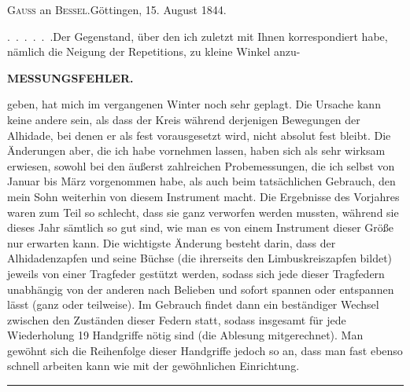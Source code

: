 \par\bigskip
\begin{center}{\large\textsc{Gauss} an \textsc{Bessel}.\quad Göttingen, 15. August 1844.}\end{center}
\par\noindent\hspace*{\parindent}.\ .\ .\ .\ .\ .\enspace Der Gegenstand, über den ich zuletzt mit Ihnen korrespondiert habe, nämlich die Neigung der Repetitions, zu kleine Winkel anzu-

\par\clearpage
\noindent\null\hfill{\small\textbf{MESSUNGSFEHLER.}}\hfill{}\par\medskip
\noindent geben, hat mich im vergangenen Winter noch sehr geplagt. Die Ursache kann keine andere sein, als dass der Kreis während derjenigen Bewegungen der Alhidade, bei denen er als fest vorausgesetzt wird, nicht absolut fest bleibt. Die Änderungen aber, die ich habe vornehmen lassen, haben sich als sehr wirksam erwiesen, sowohl bei den äußerst zahlreichen Probemessungen, die ich selbst von Januar bis März vorgenommen habe, als auch beim tatsächlichen Gebrauch, den mein Sohn weiterhin von diesem Instrument macht. Die Ergebnisse des Vorjahres waren zum Teil so schlecht, dass sie ganz verworfen werden mussten, während sie dieses Jahr sämtlich so gut sind, wie man es von einem Instrument dieser Größe nur erwarten kann. Die wichtigste Änderung besteht darin, dass der Alhidadenzapfen und seine Büchse (die ihrerseits den Limbuskreiszapfen bildet) jeweils von einer Tragfeder gestützt werden, sodass sich jede dieser Tragfedern unabhängig von der anderen nach Belieben und sofort spannen oder entspannen lässt (ganz oder teilweise). Im Gebrauch findet dann ein beständiger  Wechsel zwischen den Zuständen dieser Federn statt, sodass insgesamt für jede Wiederholung 19 Handgriffe nötig sind (die Ablesung mitgerechnet). Man gewöhnt sich die Reihenfolge dieser Handgriffe jedoch so an, dass man fast ebenso schnell arbeiten kann wie mit der gewöhnlichen Einrichtung.
\par\bigskip
\begin{center}\rule{2.6cm}{.4pt}\end{center}
\vspace{1.2cm}
